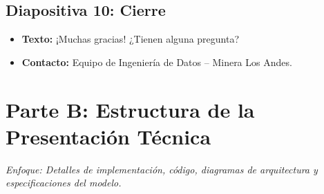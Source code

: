 \documentclass[11pt,a4paper]{article}
\begin{document}
\subsection{Diapositiva 10: Cierre}
\begin{itemize}[label=$\bullet$]
    \item \textbf{Texto:} ¡Muchas gracias! ¿Tienen alguna pregunta?
    \item \textbf{Contacto:} Equipo de Ingeniería de Datos -- Minera Los Andes.
\end{itemize}

\newpage
\section{Parte B: Estructura de la Presentación Técnica}
\textit{Enfoque: Detalles de implementación, código, diagramas de arquitectura y especificaciones del modelo.}
\end{document}
